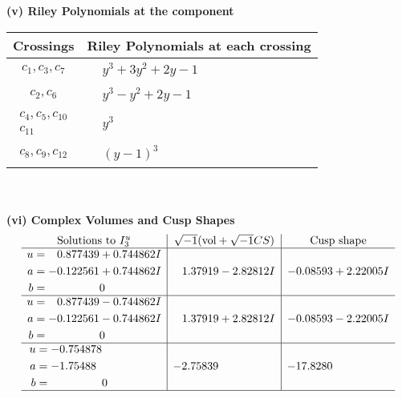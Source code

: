 \documentclass[1p]{elsarticle_modified}
\theoremstyle{definition}
\newcommand{\I}{\sqrt{-1}}
\begin{document}
\newpage\renewcommand{\arraystretch}{1}
\flushleft \textbf{(v) Riley Polynomials at the component}\newline \\
\begin{tabular}{m{50pt}|m{274pt}}
Crossings & \hspace{64pt}Riley Polynomials at each crossing \\
\hline $$\begin{aligned}c_{1},c_{3},c_{7}\end{aligned}$$&$\begin{aligned}
&y^3+3 y^2+2 y-1
\end{aligned}$\\
\hline $$\begin{aligned}c_{2},c_{6}\end{aligned}$$&$\begin{aligned}
&y^3- y^2+2 y-1
\end{aligned}$\\
\hline $$\begin{aligned}c_{4},c_{5},c_{10}\\c_{11}\end{aligned}$$&$\begin{aligned}
&y^3
\end{aligned}$\\
\hline $$\begin{aligned}c_{8},c_{9},c_{12}\end{aligned}$$&$\begin{aligned}
&(y-1)^3
\end{aligned}$\\
\hline
\end{tabular}\\~\\
\newpage\flushleft \textbf{(vi) Complex Volumes and Cusp Shapes}
$$\begin{array}{c|c|c}  
\text{Solutions to }I^u_{3}& \I (\text{vol} + \sqrt{-1}CS) & \text{Cusp shape}\\
 \hline 
\begin{aligned}
u &= \phantom{-}0.877439 + 0.744862 I \\
a &= -0.122561 + 0.744862 I \\
b &= \phantom{-0.000000 } 0\end{aligned}
 & \phantom{-}1.37919 - 2.82812 I & -0.08593 + 2.22005 I \\ \hline\begin{aligned}
u &= \phantom{-}0.877439 - 0.744862 I \\
a &= -0.122561 - 0.744862 I \\
b &= \phantom{-0.000000 } 0\end{aligned}
 & \phantom{-}1.37919 + 2.82812 I & -0.08593 - 2.22005 I \\ \hline\begin{aligned}
u &= -0.754878\phantom{ +0.000000I} \\
a &= -1.75488\phantom{ +0.000000I} \\
b &= \phantom{-0.000000 } 0\end{aligned}
 & -2.75839\phantom{ +0.000000I} & -17.8280\phantom{ +0.000000I}\\
 \hline 
 \end{array}$$\newpage
\end{document}
